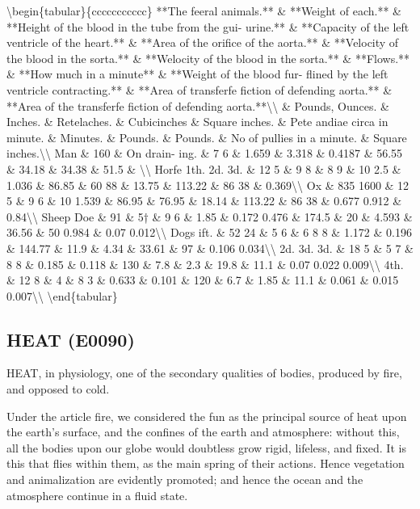\documentclass{article}
\begin{document}
\textbackslash{}begin\{tabular\}\{ccccccccccc\}
**The feeral animals.** \& **Weight of each.** \& **Height of the blood in the tube from the gui- urine.** \& **Capacity of the left ventricle of the heart.** \& **Area of the orifice of the aorta.** \& **Velocity of the blood in the sorta.** \& **Welocity of the blood in the sorta.** \& **Flows.** \& **How much in a minute** \& **Weight of the blood fur- flined by the left ventricle contracting.** \& **Area of transferfe fiction of defending aorta.** \& **Area of the transferfe fiction of defending aorta.**\textbackslash{}\textbackslash{}
 \& Pounds, Ounces. \& Inches. \& Retelaches. \& Cubicinches \& Square inches. \& Pete andiae circa in minute. \& Minutes. \& Pounds. \& Pounds. \& No of pullies in a minute. \& Square inches.\textbackslash{}\textbackslash{}
Man \& 160 \& On drain- ing. \& 7 6 \& 1.659 \& 3.318 \& 0.4187 \& 56.55 \& 34.18 \& 34.38 \& 51.5 \& \textbackslash{}\textbackslash{}
Horfe 1th. 2d. 3d. \& 12 5 \& 9 8 \& 8 9 \& 10 2.5 \& 1.036 \& 86.85 \& 60 88 \& 13.75 \& 113.22 \& 86 38 \& 0.369\textbackslash{}\textbackslash{}
Ox \& 835 1600 \& 12 5 \& 9 6 \& 10 1.539 \& 86.95 \& 76.95 \& 18.14 \& 113.22 \& 86 38 \& 0.677 0.912 \& 0.84\textbackslash{}\textbackslash{}
Sheep Doe \& 91 \& 5† \& 9 6 \& 1.85 \& 0.172 0.476 \& 174.5 \& 20 \& 4.593 \& 36.56 \& 50 0.984 \& 0.07 0.012\textbackslash{}\textbackslash{}
Dogs ift. \& 52 24 \& 5 6 \& 6 8 8 \& 1.172 \& 0.196 \& 144.77 \& 11.9 \& 4.34 \& 33.61 \& 97 \& 0.106 0.034\textbackslash{}\textbackslash{}
2d. 3d. 3d. \& 18 5 \& 5 7 \& 8 8 \& 0.185 \& 0.118 \& 130 \& 7.8 \& 2.3 \& 19.8 \& 11.1 \& 0.07 0.022 0.009\textbackslash{}\textbackslash{}
4th. \& 12 8 \& 4 \& 8 3 \& 0.633 \& 0.101 \& 120 \& 6.7 \& 1.85 \& 11.1 \& 0.061 \& 0.015 0.007\textbackslash{}\textbackslash{}
\textbackslash{}end\{tabular\}

\subsection*{HEAT (E0090)}
HEAT, in physiology, one of the secondary qualities of bodies, produced by fire, and opposed to cold.

Under the article fire, we considered the fun as the principal source of heat upon the earth's surface, and the confines of the earth and atmosphere: without this, all the bodies upon our globe would doubtless grow rigid, lifeless, and fixed. It is this that flies within them, as the main spring of their actions. Hence vegetation and animalization are evidently promoted; and hence the ocean and the atmosphere continue in a fluid state.
\end{document}
